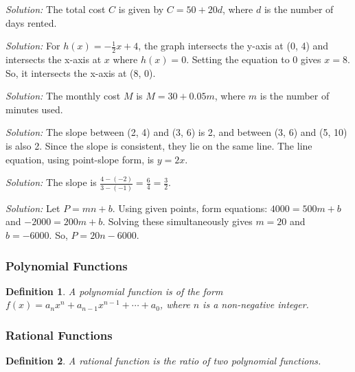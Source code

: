 \documentclass[a4paper,12pt]{book}
\newenvironment{solution}[1][]
{\par\noindent\textit{Solution:} \rmfamily}{\medskip}
\newtheorem{definition}{Definition}
\begin{document}
\begin{solution}[5]
The total cost \( C \) is given by \( C = 50 + 20d \), where \( d \) is the number of days rented.
\end{solution}

\begin{solution}[6]
For \( h(x) = -\frac{1}{2}x + 4 \), the graph intersects the y-axis at (0, 4) and intersects the x-axis at \( x \) where \( h(x) = 0 \). Setting the equation to 0 gives \( x = 8 \). So, it intersects the x-axis at (8, 0).
\end{solution}

\begin{solution}[7]
The monthly cost \( M \) is \( M = 30 + 0.05m \), where \( m \) is the number of minutes used.
\end{solution}

\begin{solution}[8]
The slope between (2, 4) and (3, 6) is 2, and between (3, 6) and (5, 10) is also 2. Since the slope is consistent, they lie on the same line. The line equation, using point-slope form, is \( y = 2x \).
\end{solution}

\begin{solution}[9]
The slope is \( \frac{4 - (-2)}{3 - (-1)} = \frac{6}{4} = \frac{3}{2} \).
\end{solution}

\begin{solution}[10]
Let \( P = mn + b \). Using given points, form equations: \( 4000 = 500m + b \) and \( -2000 = 200m + b \). Solving these simultaneously gives \( m = 20 \) and \( b = -6000 \). So, \( P = 20n - 6000 \).
\end{solution}



\subsubsection{Polynomial Functions}
\begin{definition}
A polynomial function is of the form \( f(x) = a_nx^n + a_{n-1}x^{n-1} + \cdots + a_0 \), where \( n \) is a non-negative integer.
\end{definition}

\subsubsection{Rational Functions}
\begin{definition}
A rational function is the ratio of two polynomial functions.
\end{definition}
\end{document}
